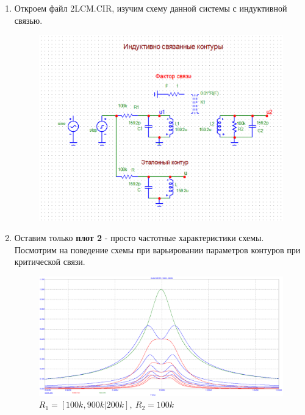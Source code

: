 \documentclass[a4paper, 12pt]{article}%
\begin{document}
\begin{enumerate}

\item Откроем файл 2LCM.CIR, изучим схему данной системы с индуктивной связью.

\begin{figure}[h!]
\centering
\includegraphics[scale = 0.7]{images/2LCM.png}
\label{fig:Image1}
\end{figure}

\item Оставим только \textbf{плот 2} - просто частотные характеристики схемы. Посмотрим на поведение схемы при варьировании параметров контуров при критической связи.

\begin{figure}[h!]
\centering
\includegraphics[scale = 0.4]{images/plot2_1.png}
\caption{$R_1 = [100k, 900k|200k], \: R_2 = 100k$}
\label{fig:Image1}
\end{figure}


\end{enumerate}
\end{document}
